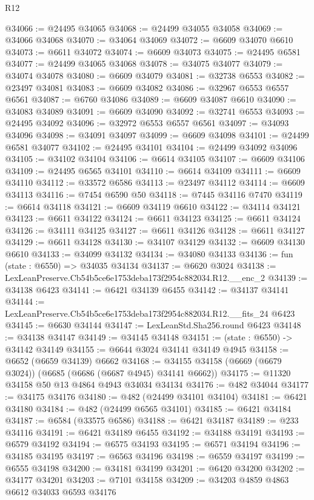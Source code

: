 \begin{lexlean}{R12}
\begin{coremodule}
@34066 := @24495 @34065
@34068 := @24499 @34055 @34058
@34069 := @34066 @34068
@34070 := @34064 @34069
@34072 := @6609 @34070 @6610
@34073 := @6611 @34072
@34074 := @6609 @34073
@34075 := @24495 @6581
@34077 := @24499 @34065 @34068
@34078 := @34075 @34077
@34079 := @34074 @34078
@34080 := @6609 @34079
@34081 := @32738 @6553
@34082 := @23497 @34081
@34083 := @6609 @34082
@34086 := @32967 @6553 @6557 @6561
@34087 := @6760 @34086
@34089 := @6609 @34087 @6610
@34090 := @34083 @34089
@34091 := @6609 @34090
@34092 := @32741 @6553
@34093 := @24495 @34092
@34096 := @32972 @6553 @6557 @6561
@34097 := @34093 @34096
@34098 := @34091 @34097
@34099 := @6609 @34098
@34101 := @24499 @6581 @34077
@34102 := @24495 @34101
@34104 := @24499 @34092 @34096
@34105 := @34102 @34104
@34106 := @6614 @34105
@34107 := @6609 @34106
@34109 := @24495 @6565 @34101
@34110 := @6614 @34109
@34111 := @6609 @34110
@34112 := @33572 @6586
@34113 := @23497 @34112
@34114 := @6609 @34113
@34116 := @7454 @6590 @50
@34118 := @7445 @34116 @7470
@34119 := @6614 @34118
@34121 := @6609 @34119 @6610
@34122 := @34114 @34121
@34123 := @6611 @34122
@34124 := @6611 @34123
@34125 := @6611 @34124
@34126 := @34111 @34125
@34127 := @6611 @34126
@34128 := @6611 @34127
@34129 := @6611 @34128
@34130 := @34107 @34129
@34132 := @6609 @34130 @6610
@34133 := @34099 @34132
@34134 := @34080 @34133
@34136 := fun (state : @6550) => @34035 @34134
@34137 := @6620 @3024
@34138 := LexLeanPreserve.Cb54b5ce6e1753deba173f2954c882034.R12.__enc_2
@34139 := @34138 @6423
@34141 := @6421 @34139 @6455
@34142 := @34137 @34141
@34144 := LexLeanPreserve.Cb54b5ce6e1753deba173f2954c882034.R12.__fits_24 @6423
@34145 := @6630 @34144
@34147 := LexLeanStd.Sha256.round @6423
@34148 := @34138 @34147
@34149 := @34145 @34148
@34151 := (state : @6550) -> @34142 @34149
@34155 := @6644 @3024 @34141 @34149 @4945
@34158 := @6652 (@6659 @34139) @6662
@34168 := @34155 @34158 (@6669 (@6679 @3024)) (@6685 (@6686 (@6687 @4945) @34141 @6662))
@34175 := @11320 @34158 @50 @13 @4864 @4943 @34034 @34134
@34176 := @482 @34044
@34177 := @34175 @34176
@34180 := @482 (@24499 @34101 @34104)
@34181 := @6421 @34180
@34184 := @482 (@24499 @6565 @34101)
@34185 := @6421 @34184
@34187 := @6584 (@33575 @6586)
@34188 := @6421 @34187
@34189 := @233 @34116
@34191 := @6421 @34189 @6455
@34192 := @34188 @34191
@34193 := @6579 @34192
@34194 := @6575 @34193
@34195 := @6571 @34194
@34196 := @34185 @34195
@34197 := @6563 @34196
@34198 := @6559 @34197
@34199 := @6555 @34198
@34200 := @34181 @34199
@34201 := @6420 @34200
@34202 := @34177 @34201
@34203 := @7101 @34158
@34209 := @34203 @4859 @4863 @6612 @34033 @6593 @34176

\end{coremodule}
\end{lexlean}
